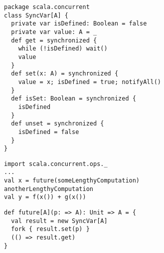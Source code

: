 

\begin{lstlisting}
package scala.concurrent
class SyncVar[A] {
  private var isDefined: Boolean = false
  private var value: A = _
  def get = synchronized {
    while (!isDefined) wait()
    value
  }
  def set(x: A) = synchronized {
    value = x; isDefined = true; notifyAll()
  }
  def isSet: Boolean = synchronized {
    isDefined
  }
  def unset = synchronized {
    isDefined = false
  }
}
\end{lstlisting}



\begin{lstlisting}
import scala.concurrent.ops._
...
val x = future(someLengthyComputation)
anotherLengthyComputation
val y = f(x()) + g(x())
\end{lstlisting}

\begin{lstlisting}
def future[A](p: => A): Unit => A = {
  val result = new SyncVar[A]
  fork { result.set(p) }
  (() => result.get)
}
\end{lstlisting}


